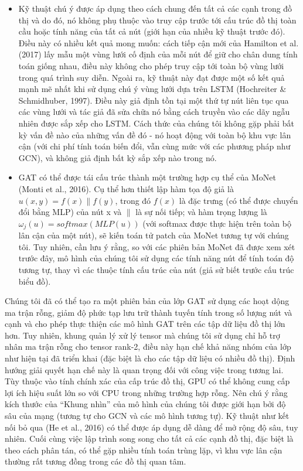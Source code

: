 \begin{itemize}
		\item Kỹ thuật chú ý được áp dụng theo cách chung đến tất cả các cạnh trong đồ thị và do đó, nó không phụ thuộc vào truy cập trước tới cấu trúc đồ thị toàn cầu hoặc tính năng của tất cả nút (giới hạn của nhiều kỹ thuật trước đó). Điều này có nhiều kết quả mong muốn: cách tiếp cận mới của Hamilton et al. (2017) lấy mẫu một vùng lưới cố định của mỗi nút để giữ cho chân dung tính toán giống nhau, điều này không cho phép truy cập tới toàn bộ vùng lưới trong quá trình suy diễn. Ngoài ra, kỹ thuật này đạt được một số kết quả mạnh mẽ nhất khi sử dụng chú ý vùng lưới dựa trên LSTM (Hochreiter \& Schmidhuber, 1997). Điều này giả định tồn tại một thứ tự nút liên tục qua các vùng lưới và tác giả đã sửa chữa nó bằng cách truyền vào các dãy ngẫu nhiên được sắp xếp cho LSTM. Cách thức của chúng tôi không gặp phải bất kỳ vấn đề nào của những vấn đề đó - nó hoạt động với toàn bộ khu vực lân cận (với chi phí tính toán biến đổi, vẫn cùng mức với các phương pháp như GCN), và không giả định bất kỳ sắp xếp nào trong nó.
		
		\item GAT có thể được tái cấu trúc thành một trường hợp cụ thể của MoNet (Monti et al., 2016). Cụ thể hơn thiết lập hàm tọa độ giả là $u(x,y) = f(x)\|f(y)$, trong đó $f(x)$ là đặc trưng (có thể được chuyển đổi bằng MLP) của nút x và $\|$ là sự nối tiếp; và hàm trọng lượng là 
		\(\omega_j(u) = softmax(MLP(u))\) 
		(với softmax được thực hiện trên toàn bộ lân cận của một nút), sẽ kiến toán tử patch của MoNet tương tự với chúng tôi. Tuy nhiên, cần lưu ý rằng, so với các phiên bản MoNet đã được xem xét trước đây, mô hình của chúng tôi sử dụng các tính năng nút để tính toán độ tương tự, thay vì các thuộc tính cấu trúc của nút (giả sử biết trước cấu trúc biểu đồ).
		
	\end{itemize}

Chúng tôi đã có thể tạo ra một phiên bản của lớp GAT sử dụng các hoạt dộng ma trận rỗng, giảm độ phức tạp lưu trữ thành tuyến tính trong số lượng nút và cạnh và cho phép thực thiện các mô hình GAT trên các tập dữ liệu đồ thị lớn hơn. Tuy nhiên, khung quản lý xử lý tensor mà chúng tôi sử dụng chỉ hỗ trợ nhân ma trận rỗng cho tensor rank-2, điều này hạn chế khả năng nhóm của lớp như hiện tại đã triển khai (đặc biệt là cho các tập dữ liệu có nhiều đồ thị). Định hướng giải quyết hạn chế này là quan trọng đối với công việc trong tương lai. Tùy thuộc vào tính chính xác của cấp trúc đồ thị, GPU có thể không cung cấp lợi ích hiệu suất lớn so với CPU trong những trường hợp rỗng. Nên chú ý rằng kích thước của “Khung nhìn” của mô hình của chúng tôi được giới hạn bởi độ sâu của mạng (tương tự cho GCN và các mô hình tương tự). Kỹ thuật như kết nối bỏ qua (He et al., 2016) có thể được áp dụng dễ dàng để mở rộng độ sâu, tuy nhiên. Cuối cùng việc lập trình song song cho tất cả các cạnh đồ thị, đặc biệt là theo cách phân tán, có thể gặp nhiều tính toán trùng lặp, vì khu vực lân cận thường rất tương đồng trong các đồ thị quan tâm.












